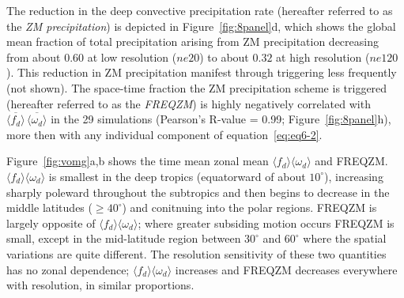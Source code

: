 The reduction in the \cite{ZM1995AO} deep convective precipitation rate (hereafter referred to as the {\em{ZM precipitation}}) is depicted in Figure~\ref{fig:8panel}d, which shows the global mean fraction of total precipitation arising from ZM precipitation decreasing from about $0.60$ at low resolution ($ne20$) to about $0.32$ at high resolution ($ne120$). This reduction in ZM precipitation manifest through triggering less frequently (not shown). The space-time fraction the ZM precipitation scheme is triggered (hereafter referred to as the {\em{FREQZM}}) is highly negatively correlated with $\overline{\langle f_{d} \rangle} \, \overline{\langle \omega_{d} \rangle}$ in the 29 simulations (Pearson's R-value = 0.99; Figure~\ref{fig:8panel}h), more then with any individual component of equation~\ref{eq:eq6-2}.

Figure~\ref{fig:vomg}a,b shows the time mean zonal mean $\langle f_{d} \rangle \langle \omega_{d} \rangle$ and FREQZM. $\langle f_{d} \rangle \langle \omega_{d} \rangle$ is smallest in the deep tropics (equatorward of about $10^{\circ}$), increasing sharply poleward throughout the subtropics and then begins to decrease in the middle latitudes ($\geq 40^{\circ}$) and conitnuing into the polar regions. FREQZM is largely opposite of $\langle f_{d} \rangle \langle \omega_{d} \rangle$; where greater subsiding motion occurs FREQZM is small, except in the mid-latitude region between $30^{\circ}$ and $60^{\circ}$ where the spatial variations are quite different. The resolution sensitivity of these two quantities has no zonal dependence; $\langle f_{d} \rangle \langle \omega_{d} \rangle$ increases and FREQZM decreases everywhere with resolution, in similar proportions.

